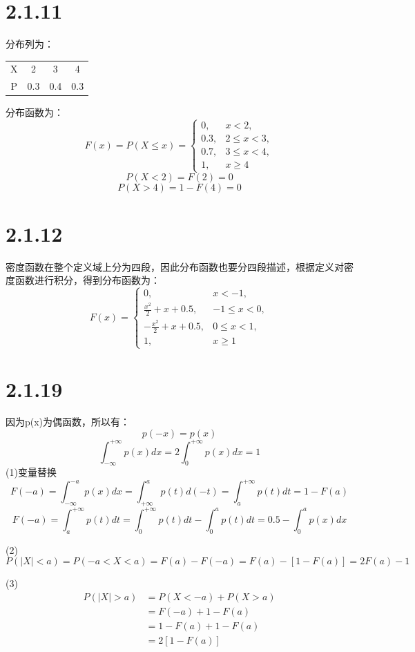\documentclass{article}
\begin{document}
\section{2.1.11}
分布列为：
\begin{table}[H]
\centering
\begin{tabular}{c|ccc}
X & 2   & 3   & 4   \\
P & 0.3 & 0.4 & 0.3
\end{tabular}
\end{table}
分布函数为：
\begin{equation}
F(x)=P(X\leq x)=
\begin{cases}
0, &x<2,\\
0.3, &2\leq x < 3,\\
0.7, &3\leq x < 4,\\
1, &x\geq 4
\end{cases}
\end{equation}
$$P(X<2)=F(2)=0$$
$$P(X>4)=1-F(4)=0$$
\section{2.1.12}
密度函数在整个定义域上分为四段，因此分布函数也要分四段描述，根据定义对密度函数进行积分，得到分布函数为：
\begin{equation}
F(x)=
\begin{cases}
0, &x<-1,\\
\frac{x^2}{2}+x+0.5, &-1\leq x < 0,\\
-\frac{x^2}{2}+x+0.5, &0\leq x < 1,\\
1, &x\geq 1
\end{cases}
\end{equation}

\section{2.1.19}
因为p(x)为偶函数，所以有：
$$p(-x)=p(x)$$
$$\int^{+\infty}_{-\infty}p(x)dx=2\int^{+\infty}_{0}p(x)dx=1$$
(1)变量替换
$$F(-a)=\int^{-a}_{-\infty}p(x)dx=\int_{+\infty}^{a}p(t)d(-t)=\int^{+\infty}_{a}p(t)dt=1-F(a)$$
$$F(-a)=\int^{+\infty}_{a}p(t)dt=\int^{+\infty}_{0}p(t)dt-\int^{a}_{0}p(t)dt=0.5-\int^{a}_{0}p(x)dx$$

(2)
$$P(|X|<a)=P(-a<X<a)=F(a)-F(-a)=F(a)-[1-F(a)]=2F(a)-1$$

(3)
\begin{align*}
P(|X|>a)&=P(X<-a)+P(X>a)\\
&=F(-a)+1-F(a)\\
&=1-F(a)+1-F(a)\\
&=2[1-F(a)]
\end{align*}
\end{document}
